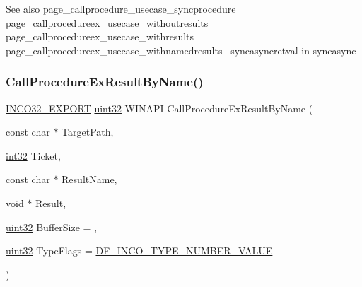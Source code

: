 \begin{DoxySeeAlso}{See also}
page\+\_\+callprocedure\+\_\+usecase\+\_\+syncprocedure~\newline
 page\+\_\+callprocedureex\+\_\+usecase\+\_\+withoutresults~\newline
 page\+\_\+callprocedureex\+\_\+usecase\+\_\+withresults~\newline
 page\+\_\+callprocedureex\+\_\+usecase\+\_\+withnamedresults~\newline
 syncasyncretval in syncasync 
\end{DoxySeeAlso}
\mbox{\label{group__commonfunctions_ga569a93aeed06c2745365c881be5e7828}} 
\subsubsection{\texorpdfstring{Call\+Procedure\+Ex\+Result\+By\+Name()}{CallProcedureExResultByName()}}
{\footnotesize\ttfamily \hyperlink{inco__32_8h_a09505cad5bbb66fc36750a4fbca0444b}{I\+N\+C\+O32\+\_\+\+E\+X\+P\+O\+RT} \hyperlink{indeltypes_8h_a4b435a49c74bb91f284f075e63416cb6}{uint32} W\+I\+N\+A\+PI Call\+Procedure\+Ex\+Result\+By\+Name (\begin{DoxyParamCaption}\item[{const char $\ast$}]{Target\+Path,  }\item[{\hyperlink{indeltypes_8h_ac44d0188f4f50fd9b03031c1a06bd0a9}{int32}}]{Ticket,  }\item[{const char $\ast$}]{Result\+Name,  }\item[{void $\ast$}]{Result,  }\item[{\hyperlink{indeltypes_8h_a4b435a49c74bb91f284f075e63416cb6}{uint32}}]{Buffer\+Size = {},  }\item[{\hyperlink{indeltypes_8h_a4b435a49c74bb91f284f075e63416cb6}{uint32}}]{Type\+Flags = {\ttfamily \hyperlink{indeldefs_8h_a0f27c7a63f462a5f51c285c85d7a5cac}{D\+F\+\_\+\+I\+N\+C\+O\+\_\+\+T\+Y\+P\+E\+\_\+\+N\+U\+M\+B\+E\+R\+\_\+\+V\+A\+L\+UE}} }\end{DoxyParamCaption})}



